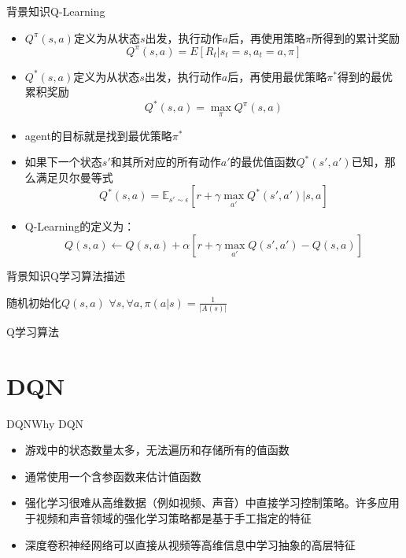 \documentclass[10pt]{beamer}
\begin{document}
	\begin{frame}{背景知识}{Q-Learning}
		\begin{itemize}
			\item $Q^{\pi}(s,a)$定义为从状态$s$出发，执行动作$a$后，再使用策略$\pi$所得到的累计奖励
			\[Q^{\pi}(s,a) = E[R_t | s_t = s, a_t = a, \pi] \]
			
			\item $Q^*(s,a)$定义为从状态$s$出发，执行动作$a$后，再使用最优策略$\pi^*$得到的最优累积奖励
			\[Q^*(s,a) = \max_{\pi}Q^{\pi}(s,a) \]
			
			\item agent的目标就是找到最优策略$\pi^*$
			
			\item 如果下一个状态$s'$和其所对应的所有动作$a'$的最优值函数$Q^*(s',a')$已知，那么满足贝尔曼等式
				\[Q^*(s,a) = \mathbb{E}_{s' \sim \epsilon}[r + \gamma \max_{a'}Q^*(s',a')|s,a] \]
			
			\item Q-Learning的定义为：
				\[ Q(s, a) \gets Q(s, a) + \alpha \left[r + \gamma \max_{a'}Q(s', a') - Q(s, a) \right] \]
		\end{itemize}
	\end{frame}

	\begin{frame}{背景知识}{Q学习算法描述}
		\begin{algorithm}[H]
			随机初始化$Q(s,a)$\;
			$\forall s, \forall a, \pi(a|s) = \frac{1}{|A(s)|} $\;
			\caption{Q学习算法}
		\end{algorithm}
	\end{frame}
	
	\section{DQN}
	
	\begin{frame}{DQN}{Why DQN}
		\begin{itemize}
			\item<2-> 游戏中的状态数量太多，无法遍历和存储所有的值函数
			
			\item<3-> 通常使用一个含参函数来估计值函数
			
			\item<4-> 强化学习很难从高维数据（例如视频、声音）中直接学习控制策略。许多应用于视频和声音领域的强化学习策略都是基于手工指定的特征
			
			\item<5-> 深度卷积神经网络可以直接从视频等高维信息中学习抽象的高层特征
		\end{itemize}
	\end{frame}
\end{document}
